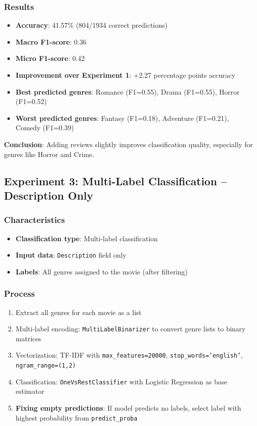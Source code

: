 \documentclass[12pt,a4paper]{article}
\begin{document}
\subsubsection{Results}
\begin{itemize}
    \item \textbf{Accuracy}: 41.57\% (804/1934 correct predictions)
    \item \textbf{Macro F1-score}: 0.36
    \item \textbf{Micro F1-score}: 0.42
    \item \textbf{Improvement over Experiment 1}: +2.27 percentage points accuracy
    \item \textbf{Best predicted genres}: Romance (F1=0.55), Drama (F1=0.55), Horror (F1=0.52)
    \item \textbf{Worst predicted genres}: Fantasy (F1=0.18), Adventure (F1=0.21), Comedy (F1=0.39)
\end{itemize}

\textbf{Conclusion}: Adding reviews slightly improves classification quality, especially for genres like Horror and Crime.

\subsection{Experiment 3: Multi-Label Classification -- Description Only}

\subsubsection{Characteristics}
\begin{itemize}
    \item \textbf{Classification type}: Multi-label classification
    \item \textbf{Input data}: \texttt{Description} field only
    \item \textbf{Labels}: All genres assigned to the movie (after filtering)
\end{itemize}

\subsubsection{Process}
\begin{enumerate}
    \item Extract all genres for each movie as a list
    \item Multi-label encoding: \texttt{MultiLabelBinarizer} to convert genre lists to binary matrices
    \item Vectorization: TF-IDF with \texttt{max\_features=20000}, \texttt{stop\_words='english'}, \texttt{ngram\_range=(1,2)}
    \item Classification: \texttt{OneVsRestClassifier} with Logistic Regression as base estimator
    \item \textbf{Fixing empty predictions}: If model predicts no labels, select label with highest probability from \texttt{predict\_proba}
\end{enumerate}
\end{document}
